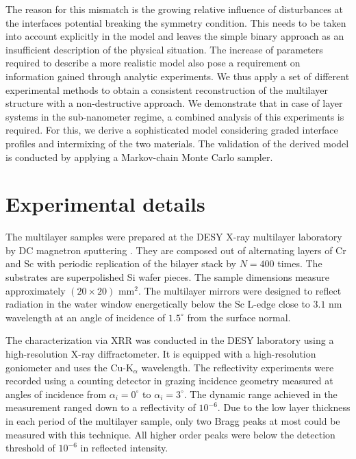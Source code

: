 The reason for this mismatch is the growing relative influence of disturbances at the interfaces potential breaking the symmetry condition. This needs to be taken into account explicitly in the model and leaves the simple binary approach as an insufficient description of the physical situation. The increase of parameters required to describe a more realistic model also pose a requirement on information gained through analytic experiments. We thus apply a set of different experimental methods to obtain a consistent reconstruction of the multilayer structure with a non-destructive approach. We demonstrate that in case of layer systems in the sub-nanometer regime, a combined analysis of this experiments is required. For this, we derive a sophisticated model considering graded interface profiles and intermixing of the two materials. The validation of the derived model is conducted by applying a Markov-chain Monte Carlo sampler.



\section{Experimental details} \label{sec:experimental}

The multilayer samples were prepared at the DESY X-ray multilayer laboratory by DC magnetron sputtering \cite{crsc_thermal_bajt} . They are composed out of alternating layers of Cr and Sc with periodic replication of the bilayer stack by $N=400$ times. The substrates are superpolished Si wafer pieces. The sample dimensions measure approximately $(20 \times 20)$ mm$^2$. The multilayer mirrors were designed to reflect radiation in the water window energetically below the Sc L-edge close to $3.1$ nm wavelength at an angle of incidence of $1.5^\circ$ from the surface normal.

The characterization via XRR was conducted in the DESY laboratory using a high-resolution X-ray diffractometer. It is equipped with a high-resolution goniometer and uses the Cu-K$_\alpha$ wavelength. The reflectivity experiments were recorded using a counting detector in grazing incidence geometry measured at angles of incidence from $\alpha_i=0^\circ$ to $\alpha_i=3^\circ$. The dynamic range achieved in the measurement ranged down to a reflectivity of $10^{-6}$. Due to the low layer thickness in each period of the multilayer sample, only two Bragg peaks at most could be measured with this technique. All higher order peaks were below the detection threshold of $10^{-6}$ in reflected intensity.

